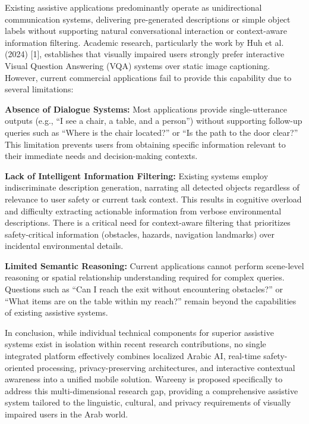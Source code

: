 \documentclass[a4paper]{report}
\begin{document}
Existing assistive applications predominantly operate as unidirectional communication systems, delivering pre-generated descriptions or simple object labels without supporting natural conversational interaction or context-aware information filtering. Academic research, particularly the work by Huh et al. (2024) [1], establishes that visually impaired users strongly prefer interactive Visual Question Answering (VQA) systems over static image captioning. However, current commercial applications fail to provide this capability due to several limitations:

\textbf{Absence of Dialogue Systems:} Most applications provide single-utterance outputs (e.g., ``I see a chair, a table, and a person'') without supporting follow-up queries such as ``Where is the chair located?'' or ``Is the path to the door clear?'' This limitation prevents users from obtaining specific information relevant to their immediate needs and decision-making contexts.

\textbf{Lack of Intelligent Information Filtering:} Existing systems employ indiscriminate description generation, narrating all detected objects regardless of relevance to user safety or current task context. This results in cognitive overload and difficulty extracting actionable information from verbose environmental descriptions. There is a critical need for context-aware filtering that prioritizes safety-critical information (obstacles, hazards, navigation landmarks) over incidental environmental details.

\textbf{Limited Semantic Reasoning:} Current applications cannot perform scene-level reasoning or spatial relationship understanding required for complex queries. Questions such as ``Can I reach the exit without encountering obstacles?'' or ``What items are on the table within my reach?'' remain beyond the capabilities of existing assistive systems.

In conclusion, while individual technical components for superior assistive systems exist in isolation within recent research contributions, no single integrated platform effectively combines localized Arabic AI, real-time safety-oriented processing, privacy-preserving architectures, and interactive contextual awareness into a unified mobile solution. Wareeny is proposed specifically to address this multi-dimensional research gap, providing a comprehensive assistive system tailored to the linguistic, cultural, and privacy requirements of visually impaired users in the Arab world.
\end{document}
